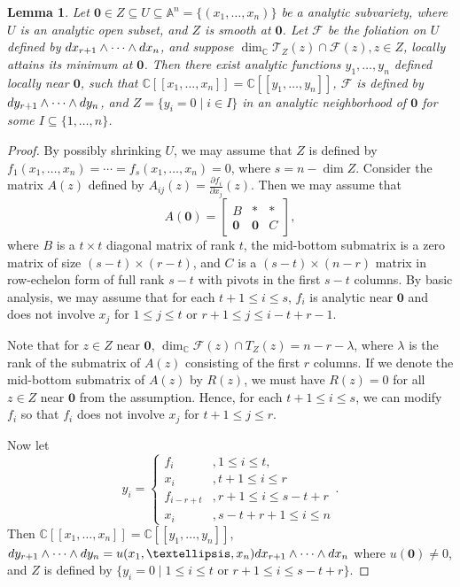 \documentclass[12pt,reqno]{amsart}
\newtheorem{lemma}[theorem]{Lemma}
\theoremstyle{definition}
\newcommand\cF{{\mathcal{F}}}
\newcommand\cT{{\mathcal{T}}}
\newcommand\bA{{\mathbb A}}
\newcommand\bC{{\mathbb C}}
\newcommand{\diff}{\textnormal{d}}
\begin{document}
\begin{lemma}\label{lem:minimal_intersection}
    Let $\mathbf 0\in Z\subseteq U\subseteq\bA^n=\{(x_1,\ldots,x_n)\}$ be a analytic subvariety, where $U$ is an analytic open subset, and $Z$ is smooth at $\mathbf 0$. Let $\cF$ be the foliation on $U$ defined by $\diff x_{r+1}\wedge\cdots\wedge\diff x_n$, and suppose
    $\dim_\bC \cT_{Z}(z)\cap\cF(z), z\in Z$, locally attains its minimum at $\mathbf 0$. Then there exist analytic functions $y_1,\ldots,y_n$ defined locally near $\mathbf 0$, such that $\bC[\![x_1,\ldots,x_n]\!]=\bC[\![y_1,\ldots,y_n]\!]$, $\cF$ is defined by $\diff y_{r+1}\wedge\cdots\wedge\diff y_n$, and $Z=\{y_i=0\mid i\in I\}$ in an analytic neighborhood of $\mathbf 0$ for some $I\subseteq\{1,\ldots,n\}$.
\end{lemma}
\begin{proof}
    By possibly shrinking $U$, we may assume that $Z$ is defined by $f_1(x_1,\ldots,x_n)=\cdots=f_s(x_1,\ldots,x_n)=0$, where $s=n-\dim Z$. Consider the matrix $A(z)$ defined by $A_{ij}(z)=\frac{\partial f_i}{\partial x_j}(z)$. Then we may assume that 
    \[
        A(\mathbf 0) =
        \begin{bmatrix}
        B & * & *\\
        \mathbf{0} & \mathbf{0} & C
        \end{bmatrix},
    \]
    where $B$ is a $t \times t$ diagonal matrix of rank $t$, the mid-bottom submatrix is a zero matrix of size $(s-t) \times (r-t)$, and $C$ is a $(s-t)\times(n-r)$ matrix in row-echelon form of full rank $s-t$ with pivots in the first $s-t$ columns. 
    By basic analysis, we may assume that for each $t+1\leq i\leq s$, $f_i$ is analytic near $\mathbf 0$ and does not involve $x_j$ for $1\leq j\leq t$ or $r+1\leq j \leq i-t+r-1$.

    Note that for $z\in Z$ near $\mathbf 0$, $\dim_\bC\cF(z)\cap T_Z(z)=n-r-\lambda$, where $\lambda$ is the rank of the submatrix of $A(z)$ consisting of the first $r$ columns. If we denote the mid-bottom submatrix of $A(z)$ by $R(z)$, we must have $R(z)=0$ for all $z\in Z$ near $\mathbf 0$ from the assumption. Hence, for each $t+1\leq i\leq s$, we can modify $f_i$ so that $f_i$ does not involve $x_j$ for $t+1\leq j\leq r$.  

    Now let 
    \[
        y_i=\left\{\begin{array}{ll}f_i &, 1\leq i \leq t,\\
            x_i &,t+1\leq i \leq r\\
            f_{i-r+t} &,r+1\leq i \leq s-t+r\\
            x_i &, s-t+r+1\leq i\leq n
            \end{array}\right..
    \]
    Then $\bC[\![x_1,\ldots,x_n]\!]=\bC[\![y_1,\ldots,y_n]\!]$, 
    $\diff y_{r+1}\wedge\cdots\wedge\diff y_n=u(x_1,\ldots,x_n)\diff x_{r+1}\wedge\cdots\wedge\diff x_n$ where $u(\mathbf 0)\neq 0$, and $Z$ is defined by $\{y_i=0\mid 1\leq i\leq t\text{ or }r+1\leq i \leq s-t+r\}$.  
\end{proof}
\end{document}
